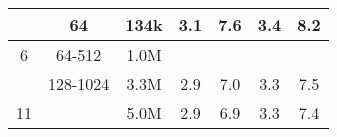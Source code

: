 \begin{table}[htbp]
\begin{tabular}{|c|c|c|c|c|c|c|}
         &       64 &        134k &                             3.1 &   7.6 &                         3.4 &   8.2 \\\hline
       6 &   64-512 &        1.0M &                                 &       &                             &       \\\cline{2-7}
         & 128-1024 &        3.3M &                             2.9 &   7.0 &                         3.3 &   7.5 \\\cline{1-1}\cline{3-7}
      11 &          &        5.0M &                             2.9 &   6.9 &                         3.3 &   7.4 \\
\hline
\end{tabular}

\end{table}
